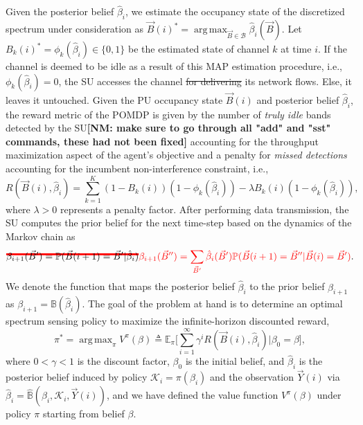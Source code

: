 \documentclass[10pt,twocolumn]{IEEEtran}
\newcommand{\sst}[1]{\st{#1}}
\newcommand{\nm}[1]{{\color{blue}\bf{[NM: #1]}}}
\DeclareMathOperator*{\argmax}{arg\,max}
\newcommand\mst[2][red]{\setbox0=\hbox{$#2$}\rlap{\raisebox{.45\ht0}{\textcolor{#1}{\rule{\wd0}{2pt}}}}#2}
\newcommand{\add}[1]{{\color{red}{#1}}}
\begin{document}
Given the posterior belief $\hat{\beta}_i$, we estimate the occupancy state of the discretized spectrum under consideration as $\vec{B}(i)^{*}{=}\argmax_{\vec{B} {\in} \mathcal{B}} \hat{\beta}_{i}(\vec{B})$. Let $B_{k}(i)^{*}{=}\phi_{k}(\hat{\beta}_{i}) {\in} \{0, 1\}$ be the estimated state of channel $k$ at time $i$. If the channel is deemed to be idle as a result of this MAP estimation procedure, i.e., $\phi_{k}(\hat{\beta}_{i}){=}0$, the SU accesses the channel\sst{ for delivering} \add{to deliver} its network flows. Else, it leaves it untouched. Given the PU occupancy state $\vec{B}(i)$ and posterior belief $\hat\beta_i$, the reward metric of the POMDP is given by the number of \emph{truly idle} bands detected by the SU\add{,}\nm{make sure to go through all "add" and "sst" commands, these had not been fixed} accounting for the throughput maximization aspect of the agent's objective\add{,} and a penalty for \emph{missed detections} accounting for the incumbent non-interference constraint, i.e.,
\begin{equation}
\nonumber
    R(\vec{B}(i), \hat{\beta}_i){=}\sum_{k=1}^{K} (1{-}B_k(i))(1{-}\phi_k(\hat{\beta}_{i})){-}\lambda B_k(i)(1 - \phi_k(\hat{\beta}_i)),
\end{equation}
where $\lambda{>}0$ represents a penalty factor. After performing data transmission, the SU computes the prior belief for the next time-step based on the dynamics of the Markov chain as
\begin{equation}\label{13}
\mst{    \beta_{i+1}(\vec{B}') = \mathbb{P}(\vec{B}(i+1) = \vec{B}'|\hat{\beta}_{i})}
    \add{\beta_{i+1}(\vec{B}'')=\sum_{\vec{B}'}\hat{\beta}_{i}(\vec{B}')\mathbb{P}(\vec{B}(i+1) = \vec{B}''|\vec{B}(i)=\vec{B}')}.
\end{equation}
We denote the function that maps the posterior belief $\hat\beta_i$ to the prior belief $\beta_{i+1}$ as $\beta_{i+1}{=}{\mathbb B}(\hat\beta_i)$.
The goal of the problem at hand is to determine an optimal spectrum sensing policy to maximize the infinite-horizon discounted reward,
\begin{equation}\label{14}
    \pi^{*}{=}\argmax_{\pi} V^{\pi}(\beta) \triangleq \mathbb{E}_{\pi} \Big[\sum_{i=1}^{\infty} \gamma^{i} R(\vec{B}(i), \hat{\beta}_i)|\beta_0 {=}\beta\Big],
\end{equation}
where $0{<}\gamma{<}1$ is the discount factor, $\beta_0$ is the initial belief, and $\hat\beta_i$ is the posterior belief induced by policy $\mathcal K_i{=}\pi(\beta_i)$ and the observation $\vec{Y}(i)$ via $\hat\beta_i{=}\hat{\mathbb B}(\beta_i, \mathcal K_i, \vec{Y}(i))$, and we have defined the value function $V^{\pi}(\beta)$ under policy $\pi$ starting from belief $\beta$.
\end{document}
